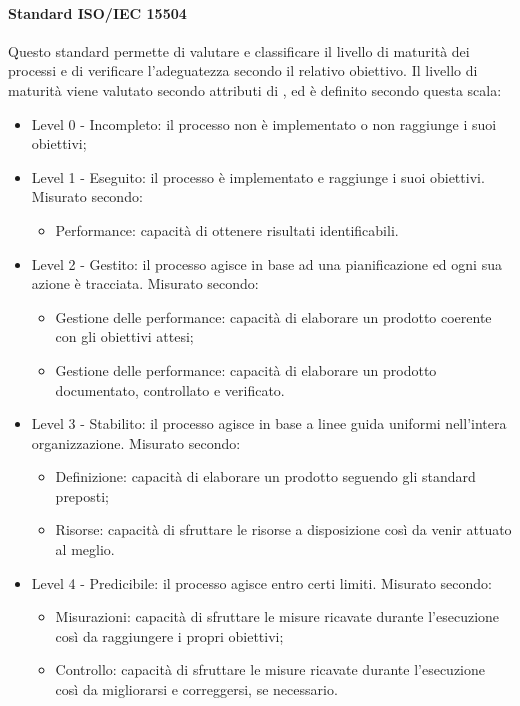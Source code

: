 \documentclass[../NormeDiProgetto_v4.0.0.tex]{subfiles}
\begin{document}
			\paragraph{Standard ISO/IEC 15504}
				Questo standard permette di valutare e classificare il livello di maturità dei processi e di verificare l'adeguatezza secondo il relativo obiettivo. Il livello di maturità viene valutato secondo attributi di , ed è definito secondo questa scala:
				\begin{itemize}
					\item Level 0 - Incompleto: il processo non è implementato o non raggiunge i suoi obiettivi;
					\item Level 1 - Eseguito: il processo è implementato e raggiunge i suoi obiettivi.
					Misurato secondo:
						\begin{itemize}
							\item Performance: capacità di ottenere risultati identificabili.
						\end{itemize}
					\item Level 2 - Gestito: il processo agisce in base ad una pianificazione ed ogni sua azione è tracciata.
					Misurato secondo:
						\begin{itemize}
							\item Gestione delle performance: capacità di elaborare un prodotto coerente con gli obiettivi attesi;
							\item Gestione delle performance: capacità di elaborare un prodotto documentato, controllato e verificato.
						\end{itemize}
					\item Level 3 - Stabilito: il processo agisce in base a linee guida uniformi nell'intera organizzazione.
					Misurato secondo:
						\begin{itemize}
							\item Definizione: capacità di elaborare un prodotto seguendo gli standard preposti;
							\item Risorse: capacità di sfruttare le risorse a disposizione così da venir attuato al meglio.
						\end{itemize}
					\item Level 4 - Predicibile: il processo agisce entro certi limiti.
					Misurato secondo:
						\begin{itemize}
							\item Misurazioni: capacità di sfruttare le misure ricavate durante l'esecuzione così da raggiungere i propri obiettivi;
							\item Controllo: capacità di sfruttare le misure ricavate durante l'esecuzione così da migliorarsi e correggersi, se necessario.

\end{itemize}
\end{itemize}
\end{document}
